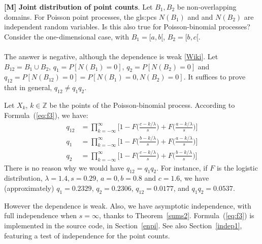\documentclass[10pt]{article}
\begin{document}
\begin{Exercise}\label{exercise43} {\bf [M]}  {\bf Joint distribution of point counts}. Let $B_1, B_2$ be non-overlapping domains. For Poisson point processes, the
\glspl{gls:pc} $N(B_1)$ and and $N(B_2)$ are independent random variables. Is this also true for Poisson-binomial processes? Consider the one-dimensional case, with $B_1=[a, b[$, $B_2=[b, c[$. \vspace{1ex} \\
 \vspace{1ex} \\
The answer is negative, although the dependence is weak [\href{https://en.wikipedia.org/wiki/Weakly_dependent_random_variables}{Wiki}]. Let $B_{12}=B_1\cup B_2$,
$q_1=P[N(B_1)=0]$, $q_2=P[N(B_2)=0]$ and $q_{12}=P[N(B_{12})=0]=P[N(B_1)=0, N(B_2)=0]$. It suffices to prove that in general,
$q_{12}\neq q_1 q_2$.

Let $X_k$, $k\in\mathbb{Z}$ be the points of the Poisson-binomial process. According to Formula~(\ref{eq:f3}), we have:
\begin{align}
q_{12} & =\prod_{k=-\infty}^\infty  \Big[1- F\Big(\frac{c-k/\lambda}{s}\Big) + F\Big(\frac{a-k/\lambda}{s}\Big)\Big] \nonumber \\
q_1 & = \prod_{k=-\infty}^\infty  \Big[1- F\Big(\frac{b-k/\lambda}{s}\Big) + F\Big(\frac{a-k/\lambda}{s}\Big)\Big]\nonumber \\
q_2 & = \prod_{k=-\infty}^\infty  \Big[1- F\Big(\frac{c-k/\lambda}{s}\Big) + F\Big(\frac{b-k/\lambda}{s}\Big)\Big]\nonumber
\end{align}
There is no reason why we would have $q_{12}=q_1q_2$. For instance, if $F$ is the logistic distribution, $\lambda=1.4, s=0.29$,
$a=0, b=0.8$ and $c=1.6$, we have (approximately) $q_{1}=0.2329$, $q_2=0.2306$, $q_{12}=0.0177$, and $q_1q_2 = 0.0537$.

However the dependence is weak. Also, we have asymptotic independence, with full independence when $s=\infty$, thanks to
Theorem~\ref{sums2}. Formula~(\ref{eq:f3}) is implemented in the source code, in Section~\ref{enpi}. See also Section~\ref{indep1}, featuring
 a test of independence for the point counts.
\end{Exercise}
\end{document}
